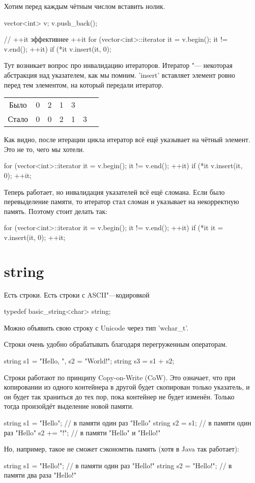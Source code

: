 
Хотим перед каждым чётным числом вставить нолик.
\begin{cppcode}
vector<int> v;
v.push_back();

// ++it эффективнее ++it
for (vector<int>::iterator it = v.begin(); it != v.end(); ++it)
{
	if (*it %
		v.insert(it, 0);
}
\end{cppcode}
Тут возникает вопрос про инвалидацию итераторов.
Итератор "--- некоторая абстракция над указателем, как мы помним.
\cpp'insert' вставляет элемент ровно перед тем элементом, на который передали итератор.
\begin{center}
\begin{tabular}{c|cccccc}
Было  & 0 & 2 & 1 & 3 & \\
Стало & 0 & 0 & 2 & 1 & 3
\end{tabular}
\end{center}
Как видно, после итерации цикла итератор всё ещё указывает на чётный элемент. Это не то, чего мы хотели.
\begin{cppcode}
for (vector<int>::iterator it = v.begin(); it != v.end(); ++it)
{
	if (*it %
	{
		v.insert(it, 0);
		++it;
	}
}
\end{cppcode}
Теперь работает, но инвалидация указателей всё ещё сломана.
Если было перевыделение памяти, то итератор стал сломан и указывает на некорректную память. Поэтому стоит делать так:
\begin{cppcode}
for (vector<int>::iterator it = v.begin(); it != v.end(); ++it)
{
	if (*it %
	{
		it = v.insert(it, 0);
		++it;
	}
}
\end{cppcode}

\section{string}

Есть строки. Есть строки с ASCII"---кодировкой
\begin{cppcode}
typedef basic_string<char> string;
\end{cppcode}
Можно объявить свою строку с Unicode через тип \cpp'wchar_t'.

Строки очень удобно обрабатывать благодаря перегруженным операторам.
\begin{cppcode}
string s1 = "Hello, ", s2 = "World!";
string s3 = s1 + s2;
\end{cppcode}

Строки работают по принципу Copy-on-Write (CoW).
Это означает, что при копировании из одного контейнера в другой будет скопирован только указатель,
и он будет так храниться до тех пор, пока контейнер не будет изменён.
Только тогда произойдёт выделение новой памяти.
\begin{cppcode}
string s1 = "Hello"; // в памяти один раз "Hello"
string s2 = s1; // в памяти один раз "Hello"
s2 += "!"; // в памяти "Hello" и "Hello!"
\end{cppcode}
Но, например, такое не сможет сэкономтиь память (хотя в Java так работает):
\begin{cppcode}
string s1 = "Hello!"; // в памяти один раз "Hello!"
string s2 = "Hello!"; // в памяти два раза "Hello!"
\end{cppcode}

